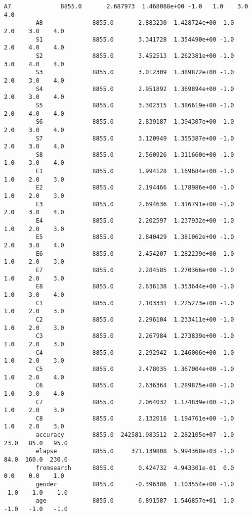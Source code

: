 \documentclass[11pt]{article}
\begin{document}
\begin{Verbatim}[commandchars=\\\{\}]
         A7              8855.0       2.687973  1.468088e+00 -1.0   1.0    3.0    4.0   
         A8              8855.0       2.883230  1.428724e+00 -1.0   2.0    3.0    4.0   
         S1              8855.0       3.341728  1.354490e+00 -1.0   2.0    4.0    4.0   
         S2              8855.0       3.452513  1.262381e+00 -1.0   3.0    4.0    4.0   
         S3              8855.0       3.012309  1.389872e+00 -1.0   2.0    3.0    4.0   
         S4              8855.0       2.951892  1.369894e+00 -1.0   2.0    3.0    4.0   
         S5              8855.0       3.302315  1.386619e+00 -1.0   2.0    4.0    4.0   
         S6              8855.0       2.839187  1.394307e+00 -1.0   2.0    3.0    4.0   
         S7              8855.0       3.120949  1.355387e+00 -1.0   2.0    3.0    4.0   
         S8              8855.0       2.560926  1.311660e+00 -1.0   1.0    3.0    4.0   
         E1              8855.0       1.994128  1.169684e+00 -1.0   1.0    2.0    3.0   
         E2              8855.0       2.194466  1.178986e+00 -1.0   1.0    2.0    3.0   
         E3              8855.0       2.694636  1.316791e+00 -1.0   2.0    3.0    4.0   
         E4              8855.0       2.202597  1.237932e+00 -1.0   1.0    2.0    3.0   
         E5              8855.0       2.840429  1.381062e+00 -1.0   2.0    3.0    4.0   
         E6              8855.0       2.454207  1.282239e+00 -1.0   1.0    2.0    3.0   
         E7              8855.0       2.284585  1.270366e+00 -1.0   1.0    2.0    3.0   
         E8              8855.0       2.636138  1.353644e+00 -1.0   1.0    3.0    4.0   
         C1              8855.0       2.103331  1.225273e+00 -1.0   1.0    2.0    3.0   
         C2              8855.0       2.296104  1.233411e+00 -1.0   1.0    2.0    3.0   
         C3              8855.0       2.267984  1.273839e+00 -1.0   1.0    2.0    3.0   
         C4              8855.0       2.292942  1.246006e+00 -1.0   1.0    2.0    3.0   
         C5              8855.0       2.478035  1.367004e+00 -1.0   1.0    2.0    4.0   
         C6              8855.0       2.636364  1.289875e+00 -1.0   1.0    3.0    4.0   
         C7              8855.0       2.064032  1.174839e+00 -1.0   1.0    2.0    3.0   
         C8              8855.0       2.132016  1.194761e+00 -1.0   1.0    2.0    3.0   
         accuracy        8855.0  242581.983512  2.282105e+07 -1.0  23.0   85.0   95.0   
         elapse          8855.0     371.139808  5.994368e+03 -1.0  84.0  160.0  230.0   
         fromsearch      8855.0       0.424732  4.943301e-01  0.0   0.0    0.0    1.0   
         gender          8855.0      -0.396386  1.103554e+00 -1.0  -1.0   -1.0   -1.0   
         age             8855.0       6.891587  1.546857e+01 -1.0  -1.0   -1.0   -1.0   
         

\end{Verbatim}
\end{document}
